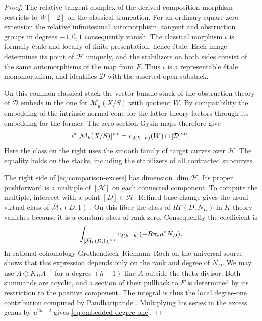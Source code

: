 \begin{proof}
The relative tangent complex of the derived composition morphism
restricts to $W[-2]$ on the classical truncation. For an ordinary
square-zero extension the relative infinitesimal automorphism,
tangent and obstruction groups in degrees $-1,0,1$ consequently
vanish. The classical morphism $\iota$ is formally \'etale and locally
of finite presentation, hence \'etale. Each image determines its
point of $\mathcal H$ uniquely, and the stabilizers on both sides consist of
the same automorphisms of the map from $F$. Thus $\iota$ is a
representable \'etale monomorphism, and identifies $\mathcal D$
with the asserted open substack.

On this common classical stack the vector bundle stack of the
obstruction theory of $\mathcal D$ embeds in the one for
$\mathcal M_k(X/S)$ with quotient $W$. By compatibility the
embedding of the intrinsic normal cone for the latter theory factors
through its embedding for the former. The zero-section Gysin maps
therefore give \cite[\S\S4--5]{BF}
\begin{equation}\label{eq:comparison-excess}
 \iota^*[\mathcal M_k(X/S)]^{\rm vir}
       =c_{2(k-h)}(W)\cap[\mathcal D]^{\rm vir}.
\end{equation}
Here the class on the right uses the smooth family of target curves
over $\mathcal H$. The equality holds on the stacks, including the stabilizers
of all contracted subcurves.

The right side of \eqref{eq:comparison-excess} has dimension
$\dim \mathcal H$. Its proper pushforward is a multiple of $[\mathcal H]$ on each
connected component. To compute the multiple, intersect with a point
$[D]\in \mathcal H$. Refined base change gives the usual virtual class of
$\overline{\mathcal M}_k(D,1)$ \cite[Proposition~7.2]{BF}.
On this fiber the class of $R\Gamma(D,N_D)$ in $K$-theory vanishes
because it is a constant class of rank zero. Consequently the
coefficient is
\[
 \int_{[\overline{\mathcal M}_{k}(D,1)]^{\rm vir}}
             c_{2(k-h)}(-R\pi_*a^*N_D).
\]
In rational cohomology Grothendieck--Riemann--Roch on the universal
source shows that this expression depends only on the rank and
degree of $N_D$. We may use $A\oplus K_DA^{-1}$ for a degree-$(h-1)$
line $A$ outside the theta divisor. Both summands are acyclic,
and a section of their pullback to $F$ is determined by its
restriction to the positive component. The integral is thus the
local degree-one contribution computed by
Pandharipande \cite[Theorem~2]{Pand}. Multiplying his series in
the excess genus by $u^{2h-2}$ gives \eqref{eq:embedded-degree-one}.
\end{proof}


